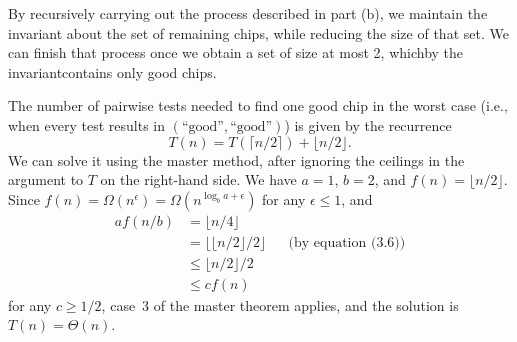By recursively carrying out the process described in part (b), we maintain the invariant about the set of remaining chips, while reducing the size of that set.
We can finish that process once we obtain a set of size at most 2, which\dash by the invariant\dash contains only good chips.

The number of pairwise tests needed to find one good chip in the worst case (i.e., when every test results in $(\text{``good''},\text{``good''})$) is given by the recurrence
\[
    T(n) = T(\lceil n/2\rceil)+\lfloor n/2\rfloor.
\]
We can solve it using the master method, after ignoring the ceilings in the argument to $T$ on the right-hand side.
We have $a=1$, $b=2$, and $f(n)=\lfloor n/2\rfloor$.
Since $f(n)=\Omega(n^\epsilon)=\Omega(n^{\log_ba+\epsilon})$ for any $\epsilon\le1$, and
\begin{align*}
    af(n/b) &= \lfloor n/4\rfloor \\
    &= \lfloor\lfloor n/2\rfloor/2\rfloor && \text{(by equation (3.6))} \\
    &\le \lfloor n/2\rfloor/2 \\
    &\le cf(n)
\end{align*}
for any $c\ge1/2$, case~3 of the master theorem applies, and the solution is $T(n)=\Theta(n)$.
